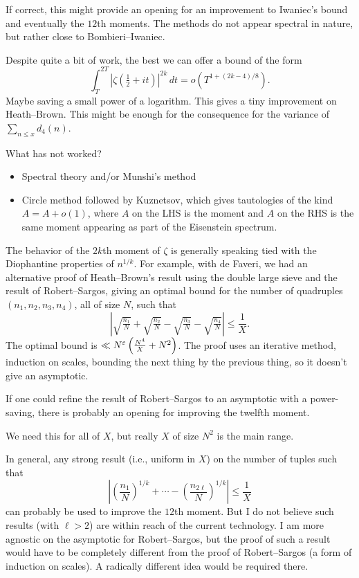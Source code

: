 \documentclass[reqno]{amsart} 
\numberwithin{theorem}{section}
\numberwithin{equation}{section}
\begin{document}
If correct, this might provide an opening for an improvement to Iwaniec's bound and eventually the $12$th moments.  The methods do not appear spectral in nature, but rather close to Bombieri--Iwaniec.

Despite quite a bit of work, the best we can offer a bound of the form
\begin{equation*}
  \int_{T}^{2 T} \left\lvert \zeta(\tfrac{1}{2} + i t) \right\rvert^{2 k} \, d t
  = o \left( T^{1 +(2 k - 4)/8} \right).
\end{equation*}
Maybe saving a small power of a logarithm.  This gives a tiny improvement on Heath--Brown.  This might be enough for the consequence for the variance of $\sum_{n \leq x} d_4(n)$.

What has not worked?
\begin{itemize}
\item Spectral theory and/or Munshi's method
\item Circle method followed by Kuznetsov, which gives tautologies of the kind $A = A + o(1)$, where $A$ on the LHS is the moment and $A$ on the RHS is the same moment appearing as part of the Eisenstein spectrum.
\end{itemize}

The behavior of the $2k$th moment of $\zeta$ is generally speaking tied with the Diophantine properties of $n^{1/k}$.  For example, with de Faveri, we had an alternative proof of Heath--Brown's result using the double large sieve and the result of Robert--Sargos, giving an optimal bound for the number of quadruples $(n_1, n_2, n_3, n_4)$, all of size $N$, such that
\begin{equation*}
  \left\lvert \sqrt{\tfrac{n_1}{N}} + \sqrt{\tfrac{n_2}{N}} - \sqrt{\tfrac{n_3}{N}} - \sqrt{\tfrac{n_4}{N}} \right\rvert \leq \frac{1}{X}.
\end{equation*}
The optimal bound is $\ll N^{\varepsilon} \left( \frac{N^4}{X} + N^2 \right)$.  The proof uses an iterative method, induction on scales, bounding the next thing by the previous thing, so it doesn't give an asymptotic.

If one could refine the result of Robert--Sargos to an asymptotic with a power-saving, there is probably an opening for improving the twelfth moment.

We need this for all of $X$, but really $X$ of size $N^2$ is the main range.

In general, any strong result (i.e., uniform in $X$) on the number of tuples such that
\begin{equation*}
  \left\lvert  \left( \frac{n_1}{N} \right)^{1/k} + \dotsb -  \left( \frac{n_{2 \ell}}{N} \right)^{1/k} \right\rvert \leq \frac{1}{X}
\end{equation*}
can probably be used to improve the $12$th moment.  But I do not believe such results (with $\ell > 2$) are within reach of the current technology.  I am more agnostic on the asymptotic for Robert--Sargos, but the proof of such a result would have to be completely different from the proof of Robert--Sargos (a form of induction on scales).  A radically different idea would be required there.
\end{document}
